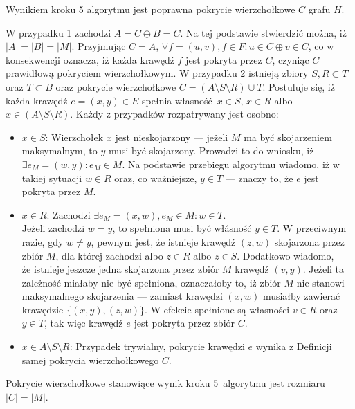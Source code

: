 \begin{theorem}\label{theorem_nf1}
  Wynikiem kroku 5 algorytmu jest poprawna pokrycie wierzchołkowe $C$
  grafu $H$.
\end{theorem}
\begin{bproof}
  W przypadku 1 zachodzi $A = C \oplus B = C$.
  Na tej podstawie stwierdzić można, iż ${|A|=|B|=|M|}$.
  Przyjmując $C = A$, $\forall{f=(u,v), f\in F}: u \in C \oplus v \in C$, co
  w konsekwencji oznacza, iż każda krawędź $f$ jest pokryta przez $C$, czyniąc
  $C$ prawidłową pokryciem wierzchołkowym.
  W przypadku 2 istnieją zbiory $S, R \subset T$ oraz $T \subset B$ oraz pokrycie wierzchołkowe $C=(A \setminus S \setminus R) \cup T$.
  Postuluje się, iż każda krawędź $e=(x, y) \in E$ spełnia własność $x \in S$, $x \in R$ albo $x \in (A \setminus S
  \setminus R)$.
  Każdy z przypadków rozpatrywany jest osobno:
  \begin{itemize}
    \item \underline{$x \in S$}: Wierzchołek $x$ jest nieskojarzony --- jeżeli $M$ ma być skojarzeniem 
      maksymalnym, to $y$ musi być skojarzony.
      Prowadzi to do wniosku, iż $\exists{e_M=(w,y)}: e_M \in M$.
      Na podstawie przebiegu algorytmu wiadomo, iż w takiej sytuacji $w \in R$
      oraz, co ważniejsze, $y \in T$ --- znaczy to, że $e$ jest pokryta przez $M$.
    \item \underline{$x \in R$}: Zachodzi $\exists{e_M=(x,w), e_M\in M}: w \in T$. \\
      Jeżeli zachodzi $w=y$, to spełniona musi być włásność $y \in T$.
      W przeciwnym razie, gdy $w \neq y$, pewnym jest, że istnieje krawędź $(z,w)$ skojarzona przez zbiór $M$, dla której zachodzi albo $z \in R$ albo $z \in S$.
      Dodatkowo wiadomo,\\że istnieje jeszcze jedna skojarzona przez zbiór $M$ krawędź $(v, y)$.
      Jeżeli ta zależność miałaby nie być spełniona, oznaczałoby to, iż zbiór $M$ nie stanowi maksymalnego skojarzenia --- zamiast krawędzi $(x,w)$ musiałby zawierać krawędzie $\{(x,y),(z,w)\}$.
      W efekcie spełnione są własności $v \in R$ oraz $y \in T$, tak więc krawędź $e$ jest pokryta przez zbiór $C$.
    \item \underline{$x \in A \setminus S \setminus R$}: Przypadek trywialny,
      pokrycie krawędzi $e$ wynika z Definicji samej pokrycia wierzchołkowego $C$.
  \end{itemize}
\end{bproof}
\begin{theorem}
  Pokrycie wierzchołkowe stanowiące wynik kroku 5\ algorytmu jest rozmiaru $|C| = |M|$. 
\end{theorem}
